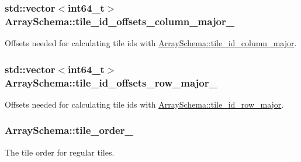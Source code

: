 \subsubsection[{tile\+\_\+id\+\_\+offsets\+\_\+column\+\_\+major\+\_\+}]{\setlength{\rightskip}{0pt plus 5cm}std\+::vector$<$int64\+\_\+t$>$ Array\+Schema\+::tile\+\_\+id\+\_\+offsets\+\_\+column\+\_\+major\+\_\+\hspace{0.3cm}{\ttfamily [private]}}\label{classArraySchema_a50e07e36d0fc5a08b61ddb18819492a0}
Offsets needed for calculating tile ids with \hyperlink{classArraySchema_a0f329fc507ecfadf52d68836f99f1725}{Array\+Schema\+::tile\+\_\+id\+\_\+column\+\_\+major}. \hypertarget{classArraySchema_a3e6712cb7b36f925bf08a56b09b0e04e}{}
\subsubsection[{tile\+\_\+id\+\_\+offsets\+\_\+row\+\_\+major\+\_\+}]{\setlength{\rightskip}{0pt plus 5cm}std\+::vector$<$int64\+\_\+t$>$ Array\+Schema\+::tile\+\_\+id\+\_\+offsets\+\_\+row\+\_\+major\+\_\+\hspace{0.3cm}{\ttfamily [private]}}\label{classArraySchema_a3e6712cb7b36f925bf08a56b09b0e04e}
Offsets needed for calculating tile ids with \hyperlink{classArraySchema_ab6ff89f2c110d474a47f0e628c0370e8}{Array\+Schema\+::tile\+\_\+id\+\_\+row\+\_\+major}. \hypertarget{classArraySchema_a194aefe70d1c7b09c6a8d7edae62e39a}{}
\subsubsection[{tile\+\_\+order\+\_\+}]{ Array\+Schema\+::tile\+\_\+order\+\_\+\hspace{0.3cm}{\ttfamily [private]}}\label{classArraySchema_a194aefe70d1c7b09c6a8d7edae62e39a}
The tile order for regular tiles. \hypertarget{classArraySchema_a13d059194797b852c97cb0dfc7226249}{}
